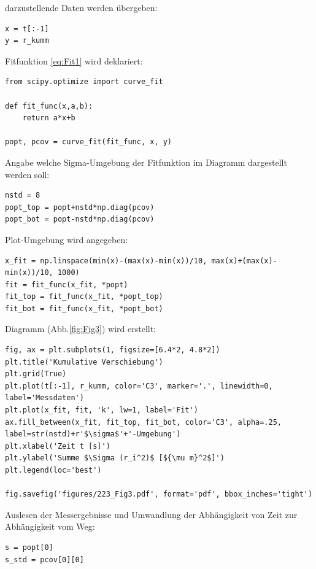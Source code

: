 \documentclass[a4paper,10pt]{article}
\begin{document}
darzustellende Daten werden übergeben:\begin{lstlisting}
x = t[:-1]
y = r_kumm

\end{lstlisting}

Fitfunktion \eqref{eq:Fit1} wird deklariert:\begin{lstlisting}
from scipy.optimize import curve_fit

def fit_func(x,a,b):
    return a*x+b

popt, pcov = curve_fit(fit_func, x, y)

\end{lstlisting}

Angabe welche Sigma-Umgebung der Fitfunktion im Diagramm dargestellt werden soll:\begin{lstlisting}
nstd = 8 
popt_top = popt+nstd*np.diag(pcov)
popt_bot = popt-nstd*np.diag(pcov)

\end{lstlisting}

Plot-Umgebung wird angegeben:\begin{lstlisting}
x_fit = np.linspace(min(x)-(max(x)-min(x))/10, max(x)+(max(x)-min(x))/10, 1000)
fit = fit_func(x_fit, *popt)
fit_top = fit_func(x_fit, *popt_top)
fit_bot = fit_func(x_fit, *popt_bot)

\end{lstlisting}

Diagramm (Abb.\ref{fig:Fig3}) wird erstellt:\begin{lstlisting}
fig, ax = plt.subplots(1, figsize=[6.4*2, 4.8*2])
plt.title('Kumulative Verschiebung')
plt.grid(True)
plt.plot(t[:-1], r_kumm, color='C3', marker='.', linewidth=0, label='Messdaten')
plt.plot(x_fit, fit, 'k', lw=1, label='Fit')
ax.fill_between(x_fit, fit_top, fit_bot, color='C3', alpha=.25, label=str(nstd)+r'$\sigma$'+'-Umgebung')
plt.xlabel('Zeit t [s]')
plt.ylabel('Summe $\Sigma (r_i^2)$ [${\mu m}^2$]')
plt.legend(loc='best')

fig.savefig('figures/223_Fig3.pdf', format='pdf', bbox_inches='tight')

\end{lstlisting}

Auslesen der Messergebnisse und Umwandlung der Abhängigkeit von Zeit zur Abhängigkeit vom Weg:\begin{lstlisting}
s = popt[0]
s_std = pcov[0][0]

\end{lstlisting}
\end{document}

